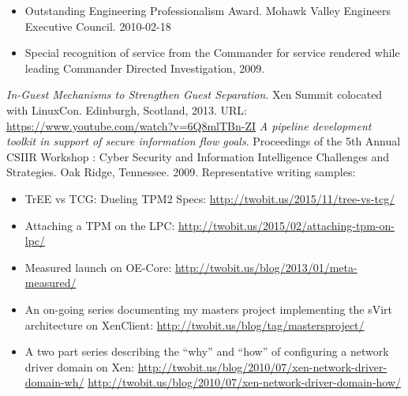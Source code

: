 \documentclass[letterpaper,11pt]{article}
\begin{document}
    \begin {itemize}
      \setlength {\itemsep}{1pt}
      \setlength {\parskip}{0pt}
      \setlength {\parsep}{0pt}
    \item Outstanding Engineering Professionalism Award.
      Mohawk Valley Engineers Executive Council.
      2010-02-18
    \item Special recognition of service from the Commander for service rendered while leading Commander Directed Investigation, 2009.
    \end {itemize}

    {\it In-Guest Mechanisms to Strengthen Guest Separation}.
    Xen Summit colocated with LinuxCon.
    Edinburgh, Scotland,
    2013.
    URL: \url {https://www.youtube.com/watch?v=6Q8mlTBn-ZI}\newline\newline
    {\it A pipeline development toolkit in support of secure information flow goals}.
    Proceedings of the 5th Annual CSIIR Workshop : Cyber Security and Information Intelligence Challenges and Strategies.
    Oak Ridge, Tennessee.
    2009.\newline\newline
    Representative writing samples:
    \begin {itemize}
      \setlength {\itemsep}{1pt}
      \setlength {\parskip}{0pt}
      \setlength {\parsep}{0pt}
    \item
      TrEE vs TCG: Dueling TPM2 Specs:
      \url {http://twobit.us/2015/11/tree-vs-tcg/}
    \item
      Attaching a TPM on the LPC:
      \url {http://twobit.us/2015/02/attaching-tpm-on-lpc/}
    \item
      Measured launch on OE-Core:
      \url {http://twobit.us/blog/2013/01/meta-measured/}
    \item
      An on-going series documenting my masters project implementing the sVirt architecture on XenClient:
      \url {http://twobit.us/blog/tag/mastersproject/}
    \item
      A two part series describing the ``why'' and ``how'' of configuring a network driver domain on Xen:
      \url {http://twobit.us/blog/2010/07/xen-network-driver-domain-wh/}
      \url {http://twobit.us/blog/2010/07/xen-network-driver-domain-how/}
    \end {itemize}
\end{document}
